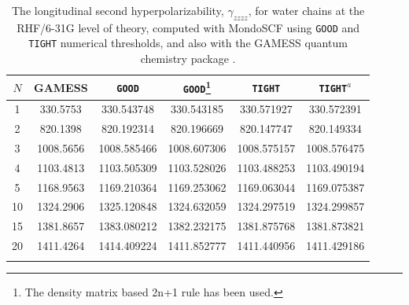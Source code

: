 \documentclass[prl,aps,letterpaper,twocolumn,showpacs,twocolumngrid,superbib]{revtex4}
\begin{document}
\begin{table}[h]
  \centering
  \caption{\protect
    The longitudinal second hyperpolarizability, $\gamma_{zzzz}$,
    for water chains at the RHF/6-31G level of theory, computed with 
    {\sc MondoSCF} using {\tt GOOD} and {\tt TIGHT} numerical thresholds, 
    and also with the {\sc GAMESS} quantum chemistry package \cite{gamess}.
  }\label{tab:Gamma_1D_Values}
  \begin{tabular}{cccccc}
    \toprule
    $N$ &\multicolumn{1}{c}{{\sc GAMESS}}
    &\multicolumn{1}{c}{{\tt GOOD}}
    &\multicolumn{1}{c}{{\tt GOOD}\footnote[1]{The density matrix based 2n+1 rule has been used.}}
    &\multicolumn{1}{c}{{\tt TIGHT}}
    &\multicolumn{1}{c}{{\tt TIGHT}$^a$} \\
    \hline
     1 &  330.5753 &  330.543748 &  330.543185 &  330.571927 &  330.572391 \\
     2 &  820.1398 &  820.192314 &  820.196669 &  820.147747 &  820.149334 \\
     3 & 1008.5656 & 1008.585466 & 1008.607306 & 1008.575157 & 1008.576475 \\
     4 & 1103.4813 & 1103.505309 & 1103.528026 & 1103.488253 & 1103.490194 \\
     5 & 1168.9563 & 1169.210364 & 1169.253062 & 1169.063044 & 1169.075387 \\
    10 & 1324.2906 & 1325.120848 & 1324.632059 & 1324.297519 & 1324.299857 \\
    15 & 1381.8657 & 1383.080212 & 1382.232175 & 1381.875768 & 1381.873821 \\
    20 & 1411.4264 & 1414.409224 & 1411.852777 & 1411.440956 & 1411.429186 \\
    \botrule
  \end{tabular}
\end{table}
\end{document}
